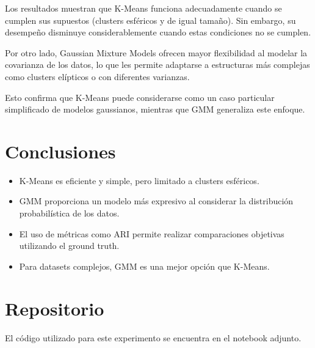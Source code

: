 \documentclass[12pt]{article}
\begin{document}
Los resultados muestran que K-Means funciona adecuadamente cuando se cumplen sus supuestos (clusters esféricos y de igual tamaño). Sin embargo, su desempeño disminuye considerablemente cuando estas condiciones no se cumplen.

Por otro lado, Gaussian Mixture Models ofrecen mayor flexibilidad al modelar la covarianza de los datos, lo que les permite adaptarse a estructuras más complejas como clusters elípticos o con diferentes varianzas.

Esto confirma que K-Means puede considerarse como un caso particular simplificado de modelos gaussianos, mientras que GMM generaliza este enfoque.

\section{Conclusiones}

\begin{itemize}
    \item K-Means es eficiente y simple, pero limitado a clusters esféricos.
    \item GMM proporciona un modelo más expresivo al considerar la distribución probabilística de los datos.
    \item El uso de métricas como ARI permite realizar comparaciones objetivas utilizando el ground truth.
    \item Para datasets complejos, GMM es una mejor opción que K-Means.
\end{itemize}

\section{Repositorio}

El código utilizado para este experimento se encuentra en el notebook adjunto.
\end{document}
